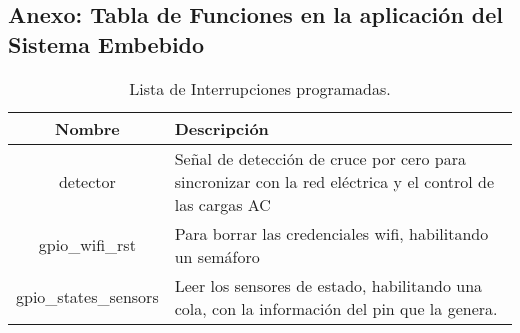 \begin{appendix}
\chapter{Anexo: Tabla de Funciones en la aplicación del Sistema Embebido}\label{AnexoA}

\begin{table}[H]
	\begin{center}
		\caption{Lista de Interrupciones programadas.}
		\label{table:inte}
		\begin{tabular}{|c|p{5cm}|}
			\hline 
			Nombre & Descripción \\ 
			\hline 
			detector & Señal de detección de cruce por cero para sincronizar con la red eléctrica y el control de las cargas AC \\ 
			\hline 
			gpio\_wifi\_rst & Para borrar las credenciales wifi, habilitando un semáforo\\ 
			\hline 
			gpio\_states\_sensors & Leer los sensores de estado, habilitando una cola, con la información del pin que la genera. \\ 
			\hline 
		\end{tabular} 
	\end{center}
\end{table}
	

\end{appendix}
